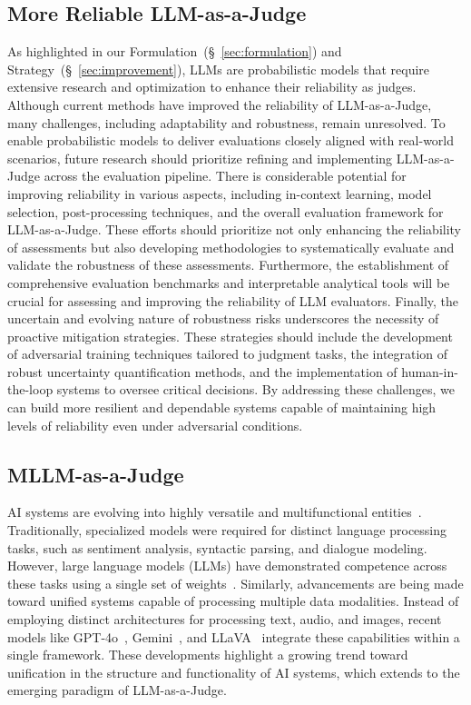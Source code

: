 \documentclass[acmsmall,screen]{acmart}
\begin{document}
\subsection{More Reliable LLM-as-a-Judge}
As highlighted in our Formulation~(\S~\ref{sec:formulation}) and Strategy~(\S~\ref{sec:improvement}), LLMs are probabilistic models that require extensive research and optimization to enhance their reliability as judges.
Although current methods have improved the reliability of LLM-as-a-Judge, many challenges, including adaptability and robustness, remain unresolved.
To enable probabilistic models to deliver evaluations closely aligned with real-world scenarios, future research should prioritize refining and implementing LLM-as-a-Judge across the evaluation pipeline.
There is considerable potential for improving reliability in various aspects, including in-context learning, model selection, post-processing techniques, and the overall evaluation framework for LLM-as-a-Judge. These efforts should prioritize not only enhancing the reliability of assessments but also developing methodologies to systematically evaluate and validate the robustness of these assessments. Furthermore, the establishment of comprehensive evaluation benchmarks and interpretable analytical tools will be crucial for assessing and improving the reliability of LLM evaluators.
Finally, the uncertain and evolving nature of robustness risks underscores the necessity of proactive mitigation strategies. These strategies should include the development of adversarial training techniques tailored to judgment tasks, the integration of robust uncertainty quantification methods, and the implementation of human-in-the-loop systems to oversee critical decisions. By addressing these challenges, we can build more resilient and dependable systems capable of maintaining high levels of reliability even under adversarial conditions.


\subsection{MLLM-as-a-Judge}

AI systems are evolving into highly versatile and multifunctional entities~\cite{inno_remote_sensing_data2024multimodal}. Traditionally, specialized models were required for distinct language processing tasks, such as sentiment analysis, syntactic parsing, and dialogue modeling. However, large language models (LLMs) have demonstrated competence across these tasks using a single set of weights~\cite{srivastava2022beyond}. Similarly, advancements are being made toward unified systems capable of processing multiple data modalities. Instead of employing distinct architectures for processing text, audio, and images, recent models like GPT-4o~\cite{openai2023gpt4}, Gemini~\cite{team2023gemini}, and LLaVA~\cite{liu2023llava} integrate these capabilities within a single framework. These developments highlight a growing trend toward unification in the structure and functionality of AI systems, which extends to the emerging paradigm of LLM-as-a-Judge. 
\end{document}

